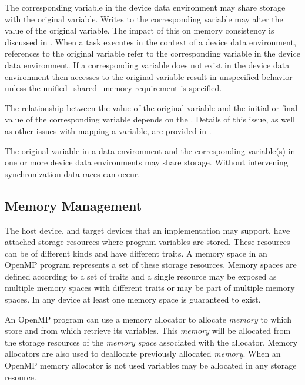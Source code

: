 The corresponding variable in the device data environment may share storage with the
original variable. Writes to the corresponding variable may alter the value of the original
variable. The impact of this on memory consistency is discussed in
.
When a task executes in the context of a device data environment, references to
the original variable refer to the corresponding variable in the device data environment.
If a corresponding variable does not exist in the device data
environment then accesses to the original variable result in
unspecified behavior unless the unified\_shared\_memory requirement
is specified.

The relationship between the value of the original variable and the initial or final value
of the corresponding variable depends on the . Details of this issue, as well as
other issues with mapping a variable, are provided in .

The original variable in a data environment and the corresponding variable(s) in one or
more device data environments may share storage. Without intervening synchronization
data races can occur.

\subsection{Memory Management}
The host device, and target devices that an implementation may support, have attached storage resources where program variables are stored. These resources can be of different kinds and have different traits. A memory space in an OpenMP program represents a set of these storage resources. Memory spaces are defined according to a set of traits and a single resource may be exposed as multiple memory spaces with different traits or may be part of multiple memory spaces. In any device at least one memory space is guaranteed to exist.

An OpenMP program can use a memory allocator to allocate \emph{memory} to which store and from which retrieve its variables. This \emph{memory} will be allocated from the storage resources of the \emph{memory space} associated with the allocator. Memory allocators are also used to deallocate previously allocated \emph{memory}. When an OpenMP memory allocator is not used variables may be allocated in any storage resource.


